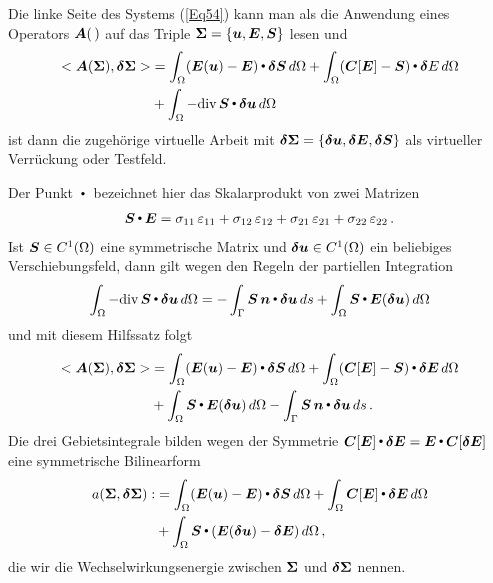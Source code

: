 Die linke Seite des Systems (\ref{Eq54}) kann man als die Anwendung eines Operators $\vek A(\, )$ auf das Triple $\vek \Sigma = \{\vek u, \vek E, \vek S\}$ lesen und
\begin{align}
<\vek A(\vek \Sigma), \vek  \delta \vek \Sigma> &= \int_{\Omega} (\vek E(\vek u) - \vek E) \dotprod \vek  \delta \vek S \,d\Omega + \int_{\Omega} (\vek C[\vek E] - \vek S)\dotprod  \vek  \delta E \,d\Omega \nn \\
&+ \int_{\Omega} - \text{div}\,\vek S \dotprod  \vek  \delta \vek  u\,d\Omega
\end{align}
ist dann die zugeh\"{o}rige virtuelle Arbeit mit  $\vek  \delta \vek \Sigma = \{\vek \delta \vek u, \vek  \delta \vek E, \vek  \delta \vek S\}$ als \glq virtueller Verr\"{u}ckung\grq{} oder  \glq Testfeld\grq{}.

Der Punkt $\dotprod $ bezeichnet hier das Skalarprodukt von zwei Matrizen
\begin{align}
\vek S \dotprod  \vek E = \sigma_{11}\,\varepsilon_{11} + \sigma_{12}\,\varepsilon_{12} + \sigma_{21}\,\varepsilon_{21} + \sigma_{22}\,\varepsilon_{22}\,.
\end{align}
Ist $\vek S \in C^1(\Omega)$ eine symmetrische Matrix und $\vek \delta \vek u \in C^1(\Omega) $ ein beliebiges Verschiebungsfeld, dann gilt wegen den Regeln der partiellen Integration
\begin{align}
\int_{\Omega} - \text{div}\,\vek S \dotprod \vek \delta \vek u \,d\Omega = - \int_{\Gamma} \vek S\,\vek n \dotprod \vek \delta \vek u \,ds + \int_{\Omega} \vek S \dotprod \vek E(\vek \delta \vek u)\,d\Omega
\end{align}
und mit diesem Hilfssatz folgt
\begin{align}
<\vek A(\vek \Sigma), \vek  \delta \vek \Sigma> &=\int_{\Omega} (\vek E(\vek u) - \vek E) \dotprod \vek  \delta \vek S \,d\Omega + \int_{\Omega} (\vek C[\vek E] - \vek S)\dotprod  \vek \delta \vek E \,d\Omega \nn \\
&+ \int_{\Omega} \vek S \dotprod \vek E(\vek \delta \vek u) \,d\Omega - \int_{\Gamma} \vek S\,\vek n \dotprod  \vek \delta \vek u \,ds\,.
\end{align}
Die drei Gebietsintegrale bilden wegen der Symmetrie $\vek C[\vek E] \dotprod  \vek  \delta \vek E = \vek E \dotprod \vek  C[\vek  \delta \vek E]$ eine symmetrische Bilinearform
\begin{align}
a(\vek \Sigma, \vek  \delta \vek \Sigma) :&= \int_{\Omega} (\vek E(\vek u) - \vek E) \dotprod \vek  \delta\vek S \,d\Omega + \int_{\Omega}\vek C[\vek E] \dotprod  \vek  \delta\vek E\,d\Omega \nn \\
&+ \int_{\Omega} \vek S \dotprod (\vek E(\vek \delta \vek u) - \vek  \delta\vek E) \,d\Omega\,,
\end{align}
die wir die Wechselwirkungsenergie zwischen $\vek \Sigma$ und $\vek  \delta \vek \Sigma $ nennen.

